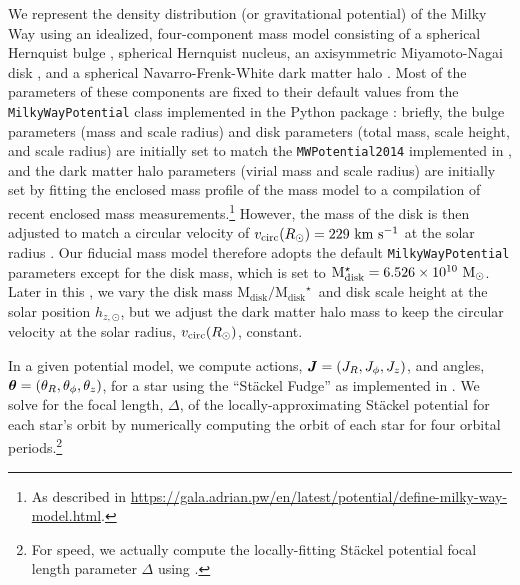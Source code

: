 \documentclass[modern]{aastex63}
\newcommand{\mdisk}{\ensuremath{\mathrm{M}_\mathrm{disk}}}
\newcommand{\mratio}{\ensuremath{\mdisk / \mdisk^\star}}
\newcommand{\hz}{\ensuremath{h_{z, \odot}}}
\begin{document}
We represent the density distribution (or gravitational potential) of the
Milky Way using an idealized, four-component mass model consisting of a
spherical Hernquist bulge \citep{Hernquist:1990}, spherical Hernquist nucleus,
an axisymmetric Miyamoto-Nagai disk \citep{Miyamoto:1975}, and a spherical
Navarro-Frenk-White dark matter halo \citep{Navarro:1996}.
Most of the parameters of these components are fixed to their default values
from the \texttt{MilkyWayPotential} class implemented in the 
Python package \citep[v1.2;][]{gala}:
briefly, the bulge parameters (mass and scale radius) and disk parameters (total
mass, scale height, and scale radius) are initially set to match the
\texttt{MWPotential2014} implemented in  \citep{Bovy:2015}, and
the dark matter halo parameters (virial mass and scale radius) are initially set
by fitting the enclosed mass profile of the mass model to a compilation of
recent enclosed mass measurements.\footnote{As described in
\url{https://gala.adrian.pw/en/latest/potential/define-milky-way-model.html}.}
However, the mass of the disk is then adjusted to match a circular velocity of
$v_{\rm circ}(R_\odot) = 229~\mathrm{km}~\mathrm{s}^{-1}$ at the solar radius \citep{Eilers:2019}.
Our fiducial mass model therefore adopts the default \texttt{MilkyWayPotential}
parameters except for the disk mass, which is set to $\mdisk^\star = 6.526
\times 10^{10}~\Msun$.
Later in this \documentname, we vary the disk mass \mratio\ and disk scale
height at the solar position \hz, but we adjust the dark matter halo mass to
keep the circular velocity at the solar radius, $v_{\rm circ}(R_\odot)$,
constant.

In a given potential model, we compute actions, $\boldsymbol{J} = (J_R, J_\phi, J_z)$,
and angles, $\boldsymbol{\theta} = (\theta_R, \theta_\phi, \theta_z)$, for a star using
the ``St\"ackel Fudge'' \citep{Binney:2012, Sanders:2012} as implemented in
 \citep{Bovy:2015}.
We solve for the focal length, $\Delta$, of the locally-approximating St\"ackel
potential for each star's orbit by numerically computing the orbit of each star
for four orbital periods.\footnote{For speed, we actually compute the
locally-fitting St\"ackel potential focal length parameter $\Delta$
\citep{Sanders:2012} using .}
\end{document}
